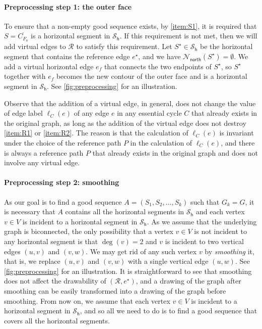 \documentclass{theoretics}
\newcommand{\RR}{\mathcal{R}}
\newcommand{\FO}{F_\mathsf{o}}
\newcommand{\PH}{\mathcal{S}_\mathsf{h}}
\newcommand{\Nnorth}{\mathcal{N}_\mathsf{north}}
\newcommand{\eref}{e^\star}
\begin{document}
 \paragraph{Preprocessing step 1: the outer face} To ensure that a non-empty good sequence exists, by \ref{item:S1}, it is required that $S  = \overline{C_{\FO}}$ is a horizontal segment in $\PH$. If this requirement is not met, then we will add virtual edges to $\RR$ to satisfy this requirement. Let $S^\star \in \PH$ be the horizontal segment that contains the reference edge $\eref$, and we have $\Nnorth(S^\star) = \emptyset$. We add a virtual horizontal edge $e_f$ that connects the two endpoints of $S^\star$, so $S^\star$ together with $e_f$ becomes the new contour of the outer face and is a horizontal segment in $\PH$. See \cref{fig:preprocessing} for an illustration.
 
 Observe that the addition of a virtual edge, in general, does not change the value of edge label $\ell_C(e)$ of any edge $e$ in any essential cycle $C$ that already exists in the original graph, as long as the addition of the virtual edge does not destroy \ref{item:R1} or \ref{item:R2}. The reason is that the calculation of $\ell_C(e)$ is invariant under the choice of the reference path $P$ in the calculation of $\ell_C(e)$, and there is always a reference path $P$ that already exists in the original graph and does not involve any virtual edge.  

 \paragraph{Preprocessing step 2: smoothing} As our goal is to find a good sequence $A=(S_1, S_2, \ldots, S_{k})$ such that $G_k = G$, it is necessary that $A$ contains all the  horizontal segments in $\PH$ and each vertex $v \in V$ is incident to a horizontal segment in $\PH$. As we assume that the underlying graph is biconnected, the only possibility that a vertex $v \in V$ is not incident to any horizontal segment is that $\deg(v) = 2$ and $v$ is incident to two vertical edges $(u,v)$ and $(v,w)$. We may get rid of any such vertex $v$ by \emph{smoothing} it, that is, we replace $(u,v)$ and $(v,w)$ with a single vertical edge $(u,w)$. See \cref{fig:preprocessing} for an illustration. It is straightforward to see that smoothing does not affect the drawability of $(\RR,\eref)$, and a drawing of the graph after smoothing can be easily transformed into a drawing of the graph before smoothing.
 From now on, we assume that each vertex $v \in V$ is incident to a horizontal segment in $\PH$, and so all we need to do is to find a good sequence that covers all the horizontal segments. 
\end{document}
